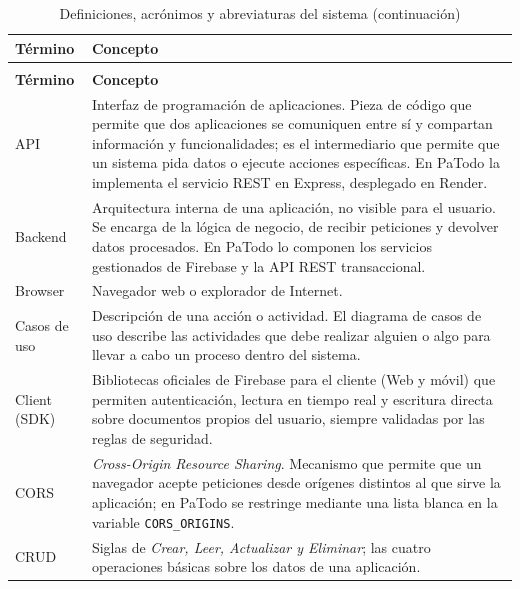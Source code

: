 \documentclass[doc,12pt,a4paper]{apa7}
\begin{document}
\begin{longtable}{|P{3.3cm}|L{11.2cm}|}
\caption{Definiciones, acrónimos y abreviaturas del sistema}\\
\hline
\textbf{Término} & \textbf{Concepto} \\ \hline
\endfirsthead
\caption[]{Definiciones, acrónimos y abreviaturas del sistema (continuación)}\\
\hline
\textbf{Término} & \textbf{Concepto} \\ \hline
\endhead
\hline
\endfoot

API & Interfaz de programación de aplicaciones. Pieza de código que permite que dos aplicaciones se comuniquen entre sí y compartan información y funcionalidades; es el intermediario que permite que un sistema pida datos o ejecute acciones específicas. En PaTodo la implementa el servicio REST en Express, desplegado en Render. \\ \hline

Backend & Arquitectura interna de una aplicación, no visible para el usuario. Se encarga de la lógica de negocio, de recibir peticiones y devolver datos procesados. En PaTodo lo componen los servicios gestionados de Firebase y la API REST transaccional. \\ \hline

Browser & Navegador web o explorador de Internet. \\ \hline

Casos de uso & Descripción de una acción o actividad. El diagrama de casos de uso describe las actividades que debe realizar alguien o algo para llevar a cabo un proceso dentro del sistema. \\ \hline

Client (SDK) & Bibliotecas oficiales de Firebase para el cliente (Web y móvil) que permiten autenticación, lectura en tiempo real y escritura directa sobre documentos propios del usuario, siempre validadas por las reglas de seguridad. \\ \hline

CORS & \textit{Cross-Origin Resource Sharing}. Mecanismo que permite que un navegador acepte peticiones desde orígenes distintos al que sirve la aplicación; en PaTodo se restringe mediante una lista blanca en la variable \texttt{CORS\_ORIGINS}. \\ \hline

CRUD & Siglas de \textit{Crear, Leer, Actualizar y Eliminar}; las cuatro operaciones básicas sobre los datos de una aplicación. \\ \hline


\end{longtable}
\end{document}
